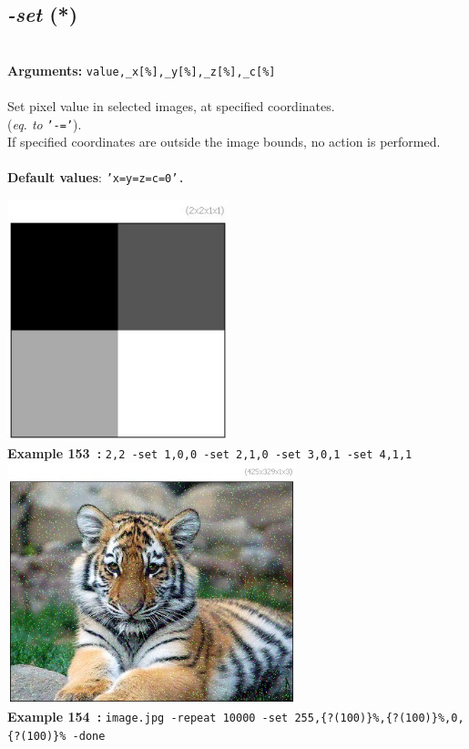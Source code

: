 \documentclass[a4paper,11pt,twoside]{book}
\begin{document}
\subsection{\emph{-set} (*)}\vspace*{-0.5em}
~\\\textbf{Arguments: } 
{\small \texttt{value,\_x[\%],\_y[\%],\_z[\%],\_c[\%]}}\\~\\
Set pixel value in selected images, at specified coordinates.
~\\(\emph{eq. to} {\small \texttt{'-='}}).
~\\If specified coordinates are outside the image bounds, no action is performed.
~\\~\\\textbf{Default values}: {\small \texttt{'x=y=z=c=0'.}}
\begin{center}\includegraphics[keepaspectratio=true,height=7cm,width=\textwidth]{img/gmic_def153.jpg}\\
{\footnotesize \textbf{Example 153~:} \texttt{2,2 -set 1,0,0 -set 2,1,0 -set 3,0,1 -set 4,1,1}}
\\\includegraphics[keepaspectratio=true,height=7cm,width=\textwidth]{img/gmic_def154.jpg}\\
{\footnotesize \textbf{Example 154~:} \texttt{image.jpg -repeat 10000 -set 255,\{?(100)\}\%,\{?(100)\}\%,0,\{?(100)\}\% -done}}
\end{center}
\end{document}
